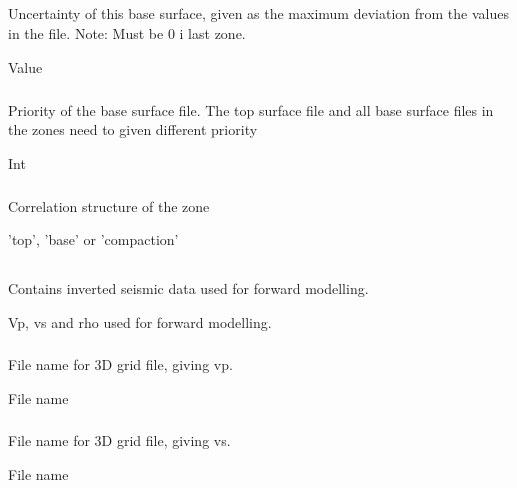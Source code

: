 \subparagraph{}
 \slist
   \item \Description Uncertainty of this base surface, given as the maximum deviation from the values in the file. Note: Must be 0 i last zone.
   \item \Argument Value
 \elist

\subparagraph{}
 \slist
   \item \Description Priority of the base surface file. The top surface file and all base surface files in the zones need to given different priority
   \item \Argument Int
   \item \Default
 \elist

\subparagraph{}
 \slist
   \item \Description Correlation structure of the zone
   \item \Argument 'top', 'base' or 'compaction'
   \item \Default
 \elist

\subsection{}
 \slist
   \item \Description Contains inverted seismic data used for forward modelling.
   \item \Argument Vp, vs and rho used for forward modelling.
   \item \Default
 \elist

\subsubsection{}
 \slist
   \item \Description File name for 3D grid file, giving vp.
   \item \Argument File name
   \item \Default
 \elist

\subsubsection{}
 \slist
   \item \Description File name for 3D grid file, giving vs.
   \item \Argument File name
   \item \Default
 \elist

